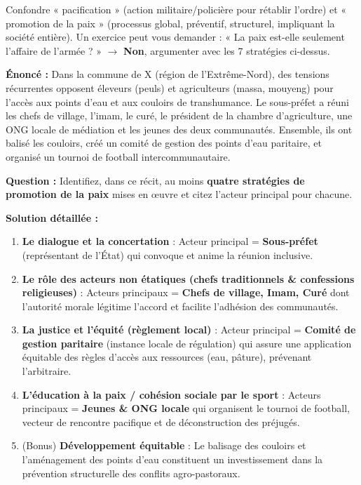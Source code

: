 \documentclass[11pt]{article}
\newcommand{\cle}[1]{{\popxbold\color{popdark}#1}}
\begin{document}
\begin{attention}
Confondre « \cle{pacification} » (action militaire/policière pour rétablir l'ordre) et « \cle{promotion de la paix} » (processus global, préventif, structurel, impliquant la société entière). Un exercice peut vous demander : « La paix est-elle seulement l'affaire de l'armée ? » $\rightarrow$ \textbf{Non}, argumenter avec les 7 stratégies ci-dessus.
\end{attention}

\begin{exoresolu}
\textbf{Énoncé :} Dans la commune de X (région de l'Extrême-Nord), des tensions récurrentes opposent éleveurs (peuls) et agriculteurs (massa, mouyeng) pour l'accès aux points d'eau et aux couloirs de transhumance. Le sous-préfet a réuni les chefs de village, l'imam, le curé, le président de la chambre d'agriculture, une ONG locale de médiation et les jeunes des deux communautés. Ensemble, ils ont balisé les couloirs, créé un comité de gestion des points d'eau paritaire, et organisé un tournoi de football intercommunautaire.

\textbf{Question :} Identifiez, dans ce récit, au moins \textbf{quatre stratégies de promotion de la paix} mises en œuvre et citez l'acteur principal pour chacune.

\tcblower
\textbf{Solution détaillée :}
\begin{enumerate}
    \item \textbf{Le dialogue et la concertation} : Acteur principal = \textbf{Sous-préfet} (représentant de l'État) qui convoque et anime la réunion inclusive.
    \item \textbf{Le rôle des acteurs non étatiques (chefs traditionnels \& confessions religieuses)} : Acteurs principaux = \textbf{Chefs de village, Imam, Curé} dont l'autorité morale légitime l'accord et facilite l'adhésion des communautés.
    \item \textbf{La justice et l'équité (règlement local)} : Acteur principal = \textbf{Comité de gestion paritaire} (instance locale de régulation) qui assure une application équitable des règles d'accès aux ressources (eau, pâture), prévenant l'arbitraire.
    \item \textbf{L'éducation à la paix / cohésion sociale par le sport} : Acteurs principaux = \textbf{Jeunes \& ONG locale} qui organisent le tournoi de football, vecteur de rencontre pacifique et de déconstruction des préjugés.
    \item (Bonus) \textbf{Développement équitable} : Le balisage des couloirs et l'aménagement des points d'eau constituent un investissement dans la prévention structurelle des conflits agro-pastoraux.
\end{enumerate}
\end{exoresolu}
\end{document}
